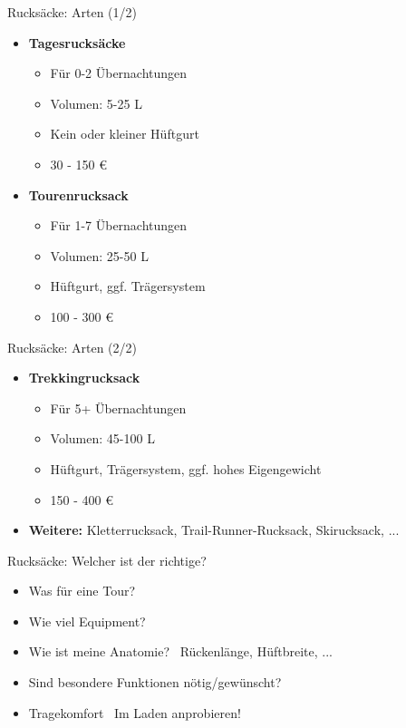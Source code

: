 \documentclass{beamer}
\begin{document}
			\begin{frame}{Rucksäcke: Arten (1/2)}
				\begin{itemize}
					\item \textbf{Tagesrucksäcke}
					\begin{itemize}
						\item Für 0-2 Übernachtungen
						\item Volumen: 5-25 L
						\item Kein oder kleiner Hüftgurt
						\item 30 - 150 €
					\end{itemize}\pause
					\item \textbf{Tourenrucksack}
					\begin{itemize}
						\item Für 1-7 Übernachtungen
						\item Volumen: 25-50 L
						\item Hüftgurt, ggf. Trägersystem
						\item 100 - 300 €
					\end{itemize}
				\end{itemize}
			\end{frame}
				
			\begin{frame}{Rucksäcke: Arten (2/2)}
				\begin{itemize}
					\item \textbf{Trekkingrucksack}
					\begin{itemize}
						\item Für 5+ Übernachtungen
						\item Volumen: 45-100 L
						\item Hüftgurt, Trägersystem, ggf. hohes Eigengewicht
						\item 150 - 400 €
					\end{itemize}\pause
					\item \textbf{Weitere:} Kletterrucksack, Trail-Runner-Rucksack, Skirucksack, ...
				\end{itemize}
			\end{frame}
			
			\begin{frame}{Rucksäcke: Welcher ist der richtige?}
				\begin{itemize}
					\item Was für eine Tour?
					\item Wie viel Equipment?
					\item Wie ist meine Anatomie? \textrightarrow\ Rückenlänge, Hüftbreite, ...
					\item Sind besondere Funktionen nötig/gewünscht?
					\item Tragekomfort \textrightarrow\ Im Laden anprobieren!
				\end{itemize}
			\end{frame}
			
\end{document}
